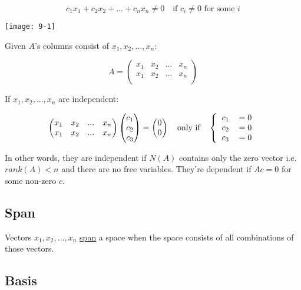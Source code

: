 \documentclass[12pt]{article}
\begin{document}
\[
c_1x_1 + c_2x_2 + ... + c_nx_n \neq 0 \quad \text{if $c_i \neq 0$ for some $i$}
\]

\begin{center}
    \texttt{[image: 9-1]}
\end{center}

Given $A$'s columns consist of $x_1,x_2,...,x_n$:

\[
A=
\left(
    \begin{matrix}
        x_1 & x_2 & ... & x_n\\
        x_1 & x_2 & ... & x_n\\
    \end{matrix}
\right)
\]

If $x_1,x_2,...,x_n$ are independent:

\[
\left(
    \begin{matrix}
        x_1 & x_2 & ... & x_n\\
        x_1 & x_2 & ... & x_n\\
    \end{matrix}
\right)
\left(
    \begin{matrix}
        c_1\\
        c_2\\
        c_3\\
    \end{matrix}
\right)
=
\left(
    \begin{matrix}
        0\\
        0\\
    \end{matrix}
\right)
\quad \text{only if}
\quad
\left \{
  \begin{tabular}{cc}
  $c_1$ & $=0$\\
  $c_2$ & $=0$\\
  $c_3$ & $=0$
  \end{tabular}
\right.
\]

In other words, they are independent if $N(A)$ contains only the zero vector i.e. $rank(A)<n$ and there are no free variables. They're dependent if $Ac=0$ for some non-zero $c$.

\subsection{Span}

Vectors $x_1,x_2,...,x_n$ \underline{span} a space when the space consists of all combinations of those vectors.

\subsection{Basis}
\end{document}
